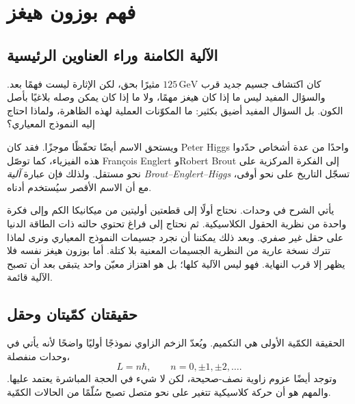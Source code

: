 \chapter{فهم بوزون هيغز}


\section{الآلية الكامنة وراء العناوين الرئيسية}

كان اكتشاف جسيم جديد قرب $125\,\mathrm{GeV}$ مثيرًا بحق، لكن الإثارة ليست فهمًا بعد. والسؤال المفيد ليس ما إذا كان هيغز مهمًا، ولا ما إذا كان يمكن وصله بلاغيًا بأصل الكون. بل السؤال المفيد أضيق بكثير: ما المكوّنات العملية لهذه الظاهرة، ولماذا احتاج إليه النموذج المعياري؟

ويستحق الاسم أيضًا تحفّظًا موجزًا. فقد كان Peter Higgs واحدًا من عدة أشخاص حدّدوا هذه الفيزياء، كما توصّل Fran\c{c}ois Englert وRobert Brout إلى الفكرة المركزية على نحو مستقل. ولذلك فإن عبارة \emph{آلية Brout--Englert--Higgs} تسجّل التاريخ على نحو أوفى، مع أن الاسم الأقصر سيُستخدم أدناه.

يأتي الشرح في وحدات. نحتاج أولًا إلى قطعتين أوليتين من ميكانيكا الكم وإلى فكرة واحدة من نظرية الحقول الكلاسيكية. ثم نحتاج إلى فراغ تحتوي حالته ذات الطاقة الدنيا على حقل غير صفري. وبعد ذلك يمكننا أن نجرد جسيمات النموذج المعياري ونرى لماذا تترك نسخة عارية من النظرية الجسيمات المعنية بلا كتلة. أما بوزون هيغز نفسه فلا يظهر إلا قرب النهاية. فهو ليس الآلية كلها؛ بل هو اهتزاز معيّن واحد يتبقى بعد أن تصبح الآلية قائمة.

\section{حقيقتان كمّيتان وحقل}

الحقيقة الكمّية الأولى هي التكميم. ويُعدّ الزخم الزاوي نموذجًا أوليًا واضحًا لأنه يأتي في وحدات منفصلة،
\begin{equation}
L=n\hbar,
\qquad
n=0,\pm1,\pm2,\ldots .
\end{equation}
وتوجد أيضًا عزوم زاوية نصف-صحيحة، لكن لا شيء في الحجة المباشرة يعتمد عليها. والمهم هو أن حركة كلاسيكية تتغير على نحو متصل تصبح سُلّمًا من الحالات الكمّية.

